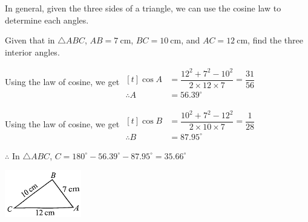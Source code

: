 \documentclass{report}
\begin{document}
    In general, given the three sides of a triangle, we can use the cosine law to determine each angles.

    \begin{question}
        Given that in $\triangle ABC$, $AB = 7 \mathrm{~cm}$, $BC = 10 \mathrm{~cm}$, and $AC = 12 \mathrm{~cm}$, find the three interior angles.

        \sol{}
        
        \begin{vwcol}[widths={0.6,0.4}, sep=8mm, rule=0pt,justify=flushleft]
            \noindent Using the law of cosine, we get $\begin{aligned}[t] \cos A&=\dfrac{12^2+7^2-10^2}{2 \times 12 \times 7}=\dfrac{31}{56} \\ \therefore A&=56.39^{\circ}\end{aligned}$

            \vspace{0.5em}
            \noindent Using the law of cosine, we get $\begin{aligned}[t] \cos B&=\dfrac{10^2+7^2-12^2}{2 \times 10 \times 7}=\dfrac{1}{28} \\ \therefore B&=87.95^{\circ}\end{aligned}$

            \vspace{0.5em}
            \noindent $\therefore$ In $\triangle A B C$, $C=180^{\circ}-56.39^{\circ}-87.95^{\circ}=35.66^{\circ}$
            \vspace{3em}

            \includegraphics[width=0.25\textwidth]{assets/10-22.jpg}
        \end{vwcol}
        \vspace{-1em}
    \end{question}
\end{document}
